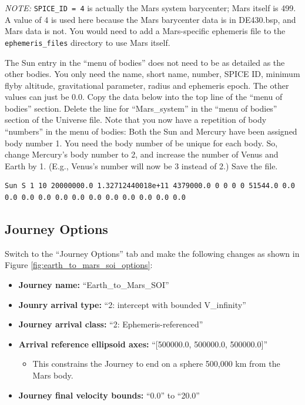 \documentclass[11pt]{article}
\begin{document}
\noindent \textit{NOTE:} \texttt{SPICE\_ID = 4} is actually the Mars system barycenter; Mars itself is 499. A value of 4 is used here because the Mars barycenter data is in DE430.bsp, and Mars data is not. You would need to add a Mars-specific ephemeris file to the \texttt{ephemeris\_files} directory to use Mars itself.

\noindent The Sun entry in the ``menu of bodies'' does not need to be as detailed as the other bodies. You only need the name, short name, number, \acs{SPICE} ID, minimum flyby altitude, gravitational parameter, radius and ephemeris epoch. The other values can just be 0.0. Copy the data below into the top line of the ``menu of bodies'' section. Delete the line for ``Mars\_system'' in the ``menu of bodies'' section of the Universe file. Note that you now have a repetition of body ``numbers'' in the menu of bodies: Both the Sun and Mercury have been assigned body number 1. You need the body number of be unique for each body. So, change Mercury’s body number to 2, and increase the number of Venus and Earth by 1. (E.g., Venus’s number will now be 3 instead of 2.) Save the file.

\begin{lstlisting}
Sun S 1 10 20000000.0 1.32712440018e+11 4379000.0 0 0 0 0 51544.0 0.0 0.0 0.0 0.0 0.0 0.0 0.0 0.0 0.0 0.0 0.0 0.0
\end{lstlisting}

\subsection{Journey Options}
\label{sec:journey_options}

Switch to the “Journey Options” tab and make the following changes as shown in Figure \ref{fig:earth_to_mars_soi_options}:

\begin{itemize}
	\item \textbf{Journey name:} ``Earth\_to\_Mars\_SOI''
	\item \textbf{Jounry arrival type:} ``2: intercept with bounded V\_infinity''
	\item \textbf{Journey arrival class:} ``2: Ephemeris-referenced''
	\item \textbf{Arrival reference ellipsoid axes:} ``[500000.0, 500000.0, 500000.0]''
	\begin{itemize}
		\item This constrains the Journey to end on a sphere 500,000 km from the Mars body.
	\end{itemize}
	\item \textbf{Journey final velocity bounds:} ``0.0'' to ``20.0''
\end{itemize}
\end{document}
